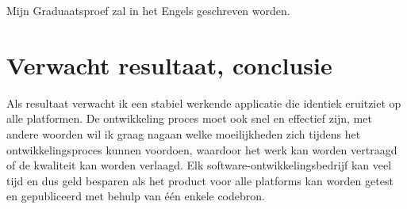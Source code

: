 Mijn Graduaatsproef zal in het Engels geschreven worden.


\section{Verwacht resultaat, conclusie}%
\label{sec:verwachte_resultaten}


Als resultaat verwacht ik een stabiel werkende applicatie die identiek eruitziet op alle platformen. De ontwikkeling proces moet ook snel en effectief zijn, met andere woorden wil ik graag nagaan welke moeilijkheden zich tijdens het ontwikkelingsproces kunnen voordoen, waardoor het werk kan worden vertraagd of de kwaliteit kan worden verlaagd. Elk software-ontwikkelingsbedrijf kan veel tijd en dus geld besparen als het product voor alle platforms kan worden getest en gepubliceerd met behulp van één enkele codebron.



